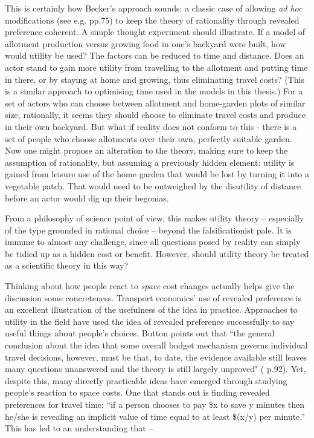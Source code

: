 This is certainly how Becker's approach sounds: a classic case of allowing \emph{ad hoc} modifications (see e.g. \citealt{chalmers_what_1999} pp.75) to keep the theory of rationality through revealed preference coherent. A simple thought experiment should illustrate. If a model of allotment production versus growing food in one's backyard were built, how would utility be used? The factors can be reduced to time and distance. Does an actor stand to gain more utility from travelling to the allotment and putting time in there, or by staying at home and growing, thus eliminating travel costs? (This is a similar approach to optimising time used in the models in this thesis.) For a set of actors who can choose between allotment and home-garden plots of similar size, rationally, it seems they should choose to eliminate travel costs and produce in their own backyard. But what if reality does not conform to this - there is a set of people who choose allotments over their own, perfectly suitable garden. Now one might propose an alteration to the theory, making sure to keep the assumption of rationality, but assuming a previously hidden element: utility is gained from leisure use of the home garden that would be lost by turning it into a vegetable patch. That would need to be outweighed by the disutility of distance before an actor would dig up their begonias.

From a philosophy of science point of view, this makes utility theory – especially of the type grounded in rational choice – beyond the falsificationist pale. It is immune to almost any challenge, since all questions posed by reality can simply be tidied up as a hidden cost or benefit. However, should utility theory be treated as a scientific theory in this way? 

Thinking about how people react to \emph{space} cost changes actually helps give the discussion some concreteness. Transport economics' use of revealed preference is an excellent illustration of the usefulness of the idea in practice.  Approaches to utility in the field have used the idea of revealed preference successfully to say useful things about people's choices. Button points out that ``the general conclusion about the idea that some overall budget mechanism governs individual travel decisions, however, must be that, to date, the evidence available still leaves many questions unanswered and the theory is still largely unproved" (\citealt{button_transport_2010} p.92). Yet, despite this, many directly practicable ideas have emerged through studying people's reaction to space costs. One that stands out is finding revealed preferences for travel time: ``if a person chooses to pay \$x to save y minutes then he/she is revealing an implicit value of time equal to at least \$(x/y) per minute.'' This has led to an understanding that –

